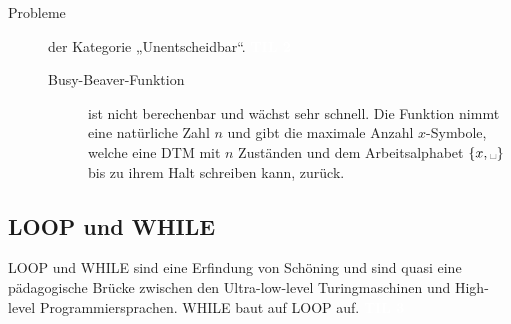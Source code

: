 \documentclass[a4paper,10pt]{article}
\newcommand{\vl}[1]{\colorbox{vl}{\textcolor{white}{\small\textbf{#1}}}}
\newcommand{\blank}{\text{\textvisiblespace}}
\begin{document}
\begin{description}
		\item[Probleme] der Kategorie „Unentscheidbar“. \vl{TIL 2}
			\begin{description}
				\item[Busy-Beaver-Funktion] ist nicht berechenbar und wächst sehr schnell. Die Funktion nimmt eine natürliche Zahl $n$ und gibt die maximale Anzahl $x$-Symbole, welche eine DTM mit $n$ Zuständen und dem Arbeitsalphabet $\{x,\blank\}$ bis zu ihrem Halt schreiben kann, zurück.
			\end{description}
    \end{description}
    
    
    \subsection{LOOP und WHILE}
    LOOP und WHILE sind eine Erfindung von Schöning und sind quasi eine pädagogische Brücke zwischen den Ultra-low-level Turingmaschinen und High-level Programmiersprachen. WHILE baut auf LOOP auf. \vl{TIL 3}
\end{document}
